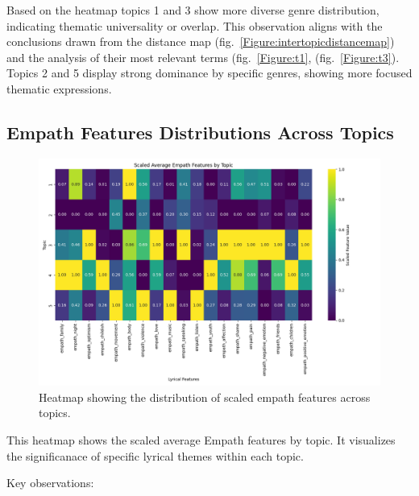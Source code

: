 Based on the heatmap topics 1 and 3 show more diverse genre distribution,
indicating thematic universality or overlap. This observation aligns with the
conclusions drawn from the  distance
map (fig.~\ref{Figure:intertopicdistancemap}) and the analysis of their most
relevant terms (fig.~\ref{Figure:t1}, (fig.~\ref{Figure:t3}). Topics 2 and
5 display strong dominance by specific genres, showing more focused thematic
expressions.


\subsection{Empath Features Distributions Across Topics}

\begin{center}
\begin{figure}[H]
  \centering
  \includegraphics[width=5in]{img/lda_empath_features.png}
  \caption{Heatmap showing the distribution of scaled empath features across topics.}
  \label{Figure:fig_eh}
\end{figure}
\end{center}


This heatmap shows the scaled average Empath features by topic. It visualizes
the significanace of specific lyrical themes within each topic. 

\noindent \noindent Key observations:

